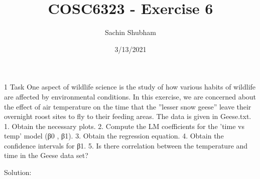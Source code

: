 \documentclass[
]{article}
\title{COSC6323 - Exercise 6}
\author{Sachin Shubham}
\date{3/13/2021}
\begin{document}
\maketitle

1 Task One aspect of wildlife science is the study of how various habits
of wildlife are affected by environmental conditions. In this exercise,
we are concerned about the effect of air temperature on the time that
the ''lesser snow geese'' leave their overnight roost sites to fly to
their feeding areas. The data is given in Geese.txt. 1. Obtain the
necessary plots. 2. Compute the LM coefficients for the 'time vs temp'
model (β0 , β1). 3. Obtain the regression equation. 4. Obtain the
confidence intervals for β1. 5. Is there correlation between the
temperature and time in the Geese data set?

Solution:
\end{document}
